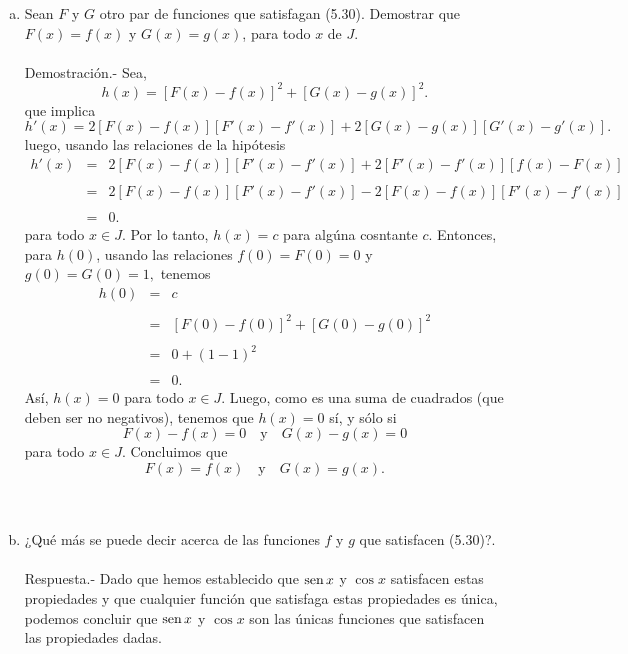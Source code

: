 \begin{enumerate}[\bfseries 1.]
\begin{enumerate}[a)]
	\item Sean $F$ y $G$ otro par de funciones que satisfagan (5.30). Demostrar que $F(x)=f(x)$ y $G(x)=g(x)$, para todo $x$ de $J$.\\\\
	    Demostración.-\; Sea,
	    $$h(x)=\left[F(x)-f(x)\right]^2+\left[G(x)-g(x)\right]^2.$$
	    que implica
	    $$h'(x)=2\left[F(x)-f(x)\right]\left[F'(x)-f'(x)\right]+2\left[G(x)-g(x)\right]\left[G'(x)-g'(x)\right].$$
	    luego, usando las relaciones de la hipótesis
	    $$
	    \begin{array}{rcl}
		h'(x) &=& 2\left[F(x)-f(x)\right]\left[F'(x)-f'(x)\right]+2\left[F'(x)-f'(x)\right]\left[f(x)-F(x)\right]\\\\
		      &=& 2\left[F(x)-f(x)\right]\left[F'(x)-f'(x)\right]-2\left[F(x)-f(x)\right]\left[F'(x)-f'(x)\right]\\\\
		      &=& 0.
	    \end{array}
	    $$
	    para todo $x\in J$. Por lo tanto, $h(x)=c$ para algúna cosntante $c$. Entonces, para $h(0)$, usando las relaciones $f(0)=F(0)=0$ y $g(0)=G(0)=1,$ tenemos
	    $$
	    \begin{array}{rcl}
		h(0) &=& c\\\\
		     &=& \left[F(0)-f(0)\right]^2+\left[G(0)-g(0)\right]^2\\\\
		     &=& 0 + (1-1)^2\\\\
		     &=& 0.
	    \end{array}
	    $$
	    Así, $h(x)=0$ para todo $x\in J$. Luego, como es una suma de cuadrados (que deben ser no negativos), tenemos que $h(x)=0$ sí, y sólo si
	    $$F(x)-f(x)=0\quad \mbox{y}\quad G(x)-g(x)=0$$
	    para todo $x\in J$. Concluimos que
	    $$F(x)=f(x)\quad \mbox{y}\quad G(x)=g(x).$$\\\\
	
	\item ¿Qué más se puede decir acerca de las funciones $f$ y $g$ que satisfacen (5.30)?.\\\\
	    Respuesta.-\; Dado que hemos establecido que $\mathop{\mbox{\normalfont sen}}\nolimits x$ y $\cos x$ satisfacen estas propiedades y que cualquier función que satisfaga estas propiedades es única, podemos concluir que $\mathop{\mbox{\normalfont sen}}\nolimits x$ y $\cos x$ son las únicas funciones que satisfacen las propiedades dadas.\\\\


\end{enumerate}
\end{enumerate}

